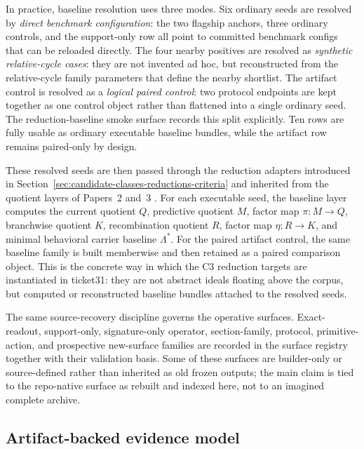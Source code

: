 \documentclass[11pt]{article}
\theoremstyle{definition}
\begin{document}
In practice, baseline resolution uses three modes. Six ordinary seeds are resolved by
\emph{direct benchmark configuration}: the two flagship anchors, three ordinary controls,
and the support-only row all point to committed benchmark configs that can be reloaded
directly. The four nearby positives are resolved as \emph{synthetic relative-cycle
cases}: they are not invented ad hoc, but reconstructed from the relative-cycle family
parameters that define the nearby shortlist. The artifact control is resolved as a
\emph{logical paired control}: two protocol endpoints are kept together as one control
object rather than flattened into a single ordinary seed. The reduction-baseline smoke
surface records this split explicitly. Ten rows are fully usable as ordinary executable
baseline bundles, while the artifact row remains paired-only by design.

These resolved seeds are then passed through the reduction adapters introduced in
Section~\ref{sec:candidate-classes-reductions-criteria} and inherited from the quotient
layers of Papers~2 and~3 \citep{Tsiokos2026HolonomyMemory,Tsiokos2026MarkingErasureRecombination}.
For each executable seed, the
baseline layer computes the current quotient $Q$, predictive quotient $M$, factor map
$\pi : M \to Q$, branchwise quotient $K$, recombination quotient $R$, factor map
$\eta : R \to K$, and minimal behavioral carrier baseline $\Lambda^\ast$. For the paired
artifact control, the same baseline family is built memberwise and then retained as a
paired comparison object. This is the concrete way in which the C3 reduction targets are
instantiated in ticket31: they are not abstract ideals floating above the corpus, but
computed or reconstructed baseline bundles attached to the resolved seeds.

The same source-recovery discipline governs the operative surfaces. Exact-readout,
support-only, signature-only operator, section-family, protocol, primitive-action, and
prospective new-surface families are recorded in the surface registry together with
their validation basis. Some of these surfaces are builder-only or source-defined
rather than inherited as old frozen outputs; the main claim is tied to the repo-native
surface as rebuilt and indexed here, not to an imagined complete archive.

\subsection{Artifact-backed evidence model}
\end{document}
